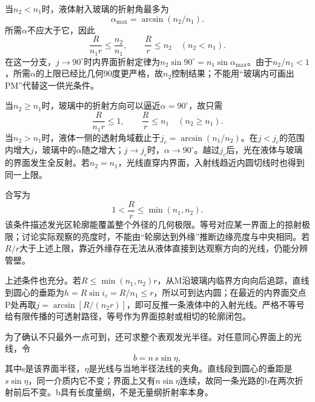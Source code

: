 \documentclass[UTF8,fontset=fandol,a4paper,11pt]{ctexart}
\begin{document}
当$n_2<n_1$时，液体射入玻璃的折射角最多为
\[
\alpha_{\max}=\arcsin(n_2/n_1).
\]
所需$\alpha$不应大于它，因此
\[
\frac{R}{n_1r}\le\frac{n_2}{n_1},\qquad
\boxed{\frac Rr\le n_2\quad(n_2<n_1)}.
\]
在这一分支，$j\to90^\circ$时内界面折射定律为$n_2\sin90^\circ=n_1\sin\alpha_{\max}$。由于$n_2/n_1<1$，所需$\alpha$的上限已经比几何90度更严格，故$n_2$控制结果；不能用“玻璃内可画出PM”代替这一供光条件。

当$n_2\ge n_1$时，玻璃中的折射方向可以逼近$\alpha=90^\circ$，故只需
\[
\frac{R}{n_1r}\le1,\qquad
\boxed{\frac Rr\le n_1\quad(n_2\ge n_1)}.
\]
当$n_2>n_1$时，液体一侧的透射角域截止于$j_c=\arcsin(n_1/n_2)$。在$j<j_c$的范围内增大$j$，玻璃中的$\alpha$随之增大；$j\to j_c$时，$\alpha\to90^\circ$。越过$j_c$后，光在液体与玻璃的界面发生全反射。若$n_2=n_1$，光线直穿内界面，入射线趋近内圆切线时也得到同一上限。

合写为
\[
\boxed{1<\frac Rr\le \min(n_1,n_2)}.
\]
该条件描述发光区轮廓能覆盖整个外径的几何极限。等号对应某一界面上的掠射极限；讨论实际观察的亮度时，不能由“轮廓达到外缘”推断边缘亮度与中央相同。若$R/r$大于上述上限，靠近外缘存在无法从液体直接到达观察方向的光线，仍能分辨管壁。


上述条件也充分。若$R\le\min(n_1,n_2)r$，从M沿玻璃内临界方向向后追踪，直线到圆心的垂距为$h=R\sin i_c=R/n_1\le r$，所以可到达内圆；在最近的内界面交点P处再取$j=\arcsin[R/(n_2r)]$，即可反推一条液体中的入射光线。严格不等号给有限传播的可透射路径，等号作为界面掠射或相切的轮廓闭包。

为了确认不只最外一点可到，还可求整个表观发光半径。对任意同心界面上的光线，令
\[
b=n\,s\sin\eta ,
\]
其中s是该界面半径，$\eta$是光线与当地半径法线的夹角。直线段到圆心的垂距是$s\sin\eta$，同一介质内它不变；界面上又有$n\sin\eta$连续，故同一条光路的b在两次折射前后不变。b具有长度量纲，不是无量纲折射率本身。
\end{document}
